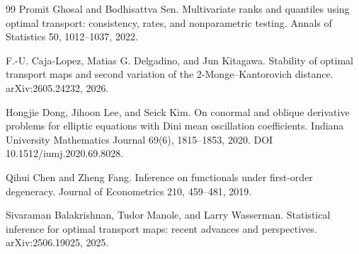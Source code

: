 \documentclass{article}
\begin{document}
\begin{thebibliography}{99}
   Promit Ghosal and Bodhisattva Sen. Multivariate ranks and quantiles using optimal transport: consistency, rates, and nonparametric testing. Annals of Statistics 50, 1012--1037, 2022.

   F.-U. Caja-Lopez, Matias G. Delgadino, and Jun Kitagawa. Stability of optimal transport maps and second variation of the 2-Monge--Kantorovich distance. arXiv:2605.24232, 2026.

   Hongjie Dong, Jihoon Lee, and Seick Kim. On conormal and oblique derivative problems for elliptic equations with Dini mean oscillation coefficients. Indiana University Mathematics Journal 69(6), 1815--1853, 2020. DOI 10.1512/iumj.2020.69.8028.

   Qihui Chen and Zheng Fang. Inference on functionals under first-order degeneracy. Journal of Econometrics 210, 459--481, 2019.

   Sivaraman Balakrishnan, Tudor Manole, and Larry Wasserman. Statistical inference for optimal transport maps: recent advances and perspectives. arXiv:2506.19025, 2025.

\end{thebibliography}
\end{document}
